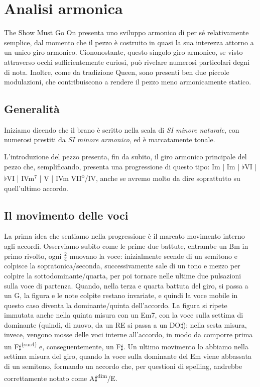 \documentclass[12pt]{article}
\begin{document}
\section{Analisi armonica}
The Show Must Go On presenta uno sviluppo armonico di per sé relativamente semplice, dal momento che il pezzo è costruito in quasi la sua interezza attorno a un unico giro armonico. Ciononostante, questo singolo giro armonico, se visto attraverso occhi sufficientemente curiosi, può rivelare numerosi particolari degni di nota. Inoltre, come da tradizione Queen, sono presenti ben due piccole modulazioni, che contribuiscono a rendere il pezzo meno armonicamente statico.

\subsection{Generalità}

Iniziamo dicendo che il brano è scritto nella scala di \emph{SI minore naturale}, con numerosi prestiti da \emph{SI minore armonico}, ed è marcatamente tonale.

L'introduzione del pezzo presenta, fin da subito, il giro armonico principale del pezzo che, semplificando, presenta una progressione di questo tipo: Im | Im | \(\flat\)VI | \(\flat\)VI | IVm\(^{7}\) | V | IVm VII\textsuperscript{o}/IV, anche se avremo molto da dire soprattutto su quell'ultimo accordo.

\subsection{Il movimento delle voci}
La prima idea che sentiamo nella progressione è il marcato movimento interno agli accordi. Osserviamo subito come le prime due battute, entrambe un Bm in primo rivolto, ogni \(\frac{2}{4}\) muovano la voce: inizialmente scende di un semitono e colpisce la sopratonica/seconda, successivamente sale di un tono e mezzo per colpire la sottodominante/quarta, per poi tornare nelle ultime due pulsazioni sulla voce di partenza. Quando, nella terza e quarta battuta del giro, si passa a un G, la figura e le note colpite restano invariate, e quindi la voce mobile in questo caso diventa la dominante/quinta dell'accordo. La figura si ripete immutata anche nella quinta misura con un Em7, con la voce sulla settima di dominante (quindi, di nuovo, da un RE si passa a un DO\(\sharp\)); nella sesta misura, invece, vengono mosse delle voci interne all'accordo, in modo da comporre prima un F\(\sharp\)\textsuperscript{(sus\(4\))} e, conseguentemente, un F\(\sharp\). Un ultimo movimento lo abbiamo nella settima misura del giro, quando la voce sulla dominante del Em viene abbassata di un semitono, formando un accordo che, per questioni di spelling, andrebbe correttamente notato come A\(\sharp\)\textsuperscript{dim}/E.
\end{document}
